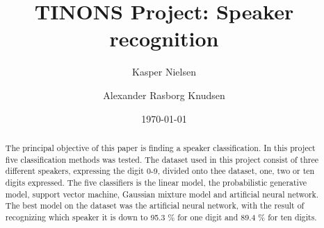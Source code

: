 

\usepackage[footnote,draft,english,silent,nomargin]{fixme}



\title{TINONS Project: Speaker recognition}

\author{Kasper Nielsen}%
\author{Alexander Rasborg Knudsen}%
\date{\today} %

\begin{abstract}
\bigskip
The principal objective of this paper is finding a speaker classification. 
In this project five classification methods was tested.
The dataset used in this project consist of three different speakers, expressing the digit 0-9, divided onto thee dataset, one, two or ten digits expressed.
The five classifiers is the linear model, the probabilistic generative model, support vector machine, Gaussian mixture model and artificial neural network.
The best model on the dataset was the artificial neural network, with the result of recognizing  which speaker it is down to 95.3 \% for one digit and 89.4 \% for ten digits. 
\end{abstract}

\maketitle
\noindent







	 


	







\renewcommand{\bibname}{2 Reference Document}





